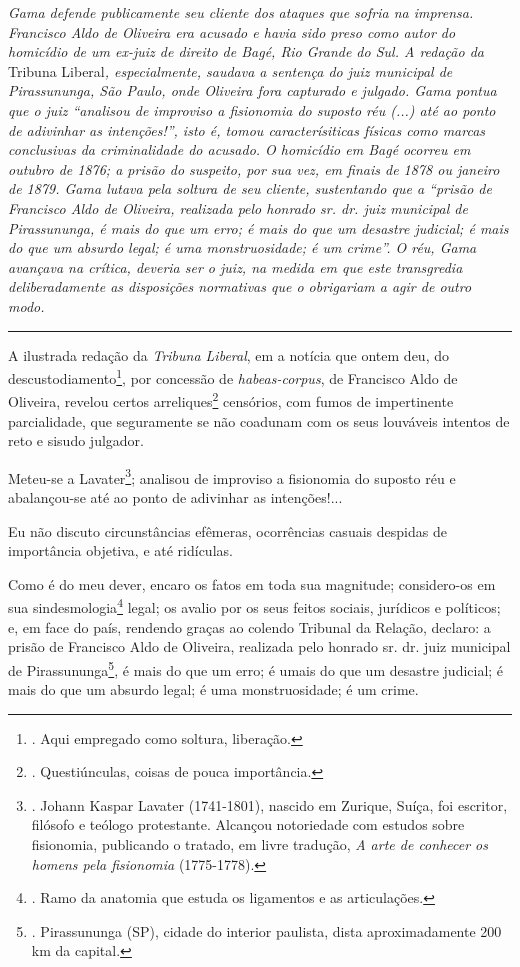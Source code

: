 \emph{Gama defende publicamente seu cliente dos ataques que sofria na
imprensa. Francisco Aldo de Oliveira era acusado e havia sido preso como
autor do homicídio de um ex-juiz de direito de Bagé, Rio Grande do Sul.
A redação da} Tribuna Liberal\emph{, especialmente, saudava a sentença
do juiz municipal de Pirassununga, São Paulo, onde Oliveira fora
capturado e julgado. Gama pontua que o juiz ``analisou de improviso a
fisionomia do suposto réu (...) até ao ponto de adivinhar as
intenções!'', isto é, tomou caracterísiticas físicas como marcas
conclusivas da criminalidade do acusado. O homicídio em Bagé ocorreu em
outubro de 1876; a prisão do suspeito, por sua vez, em finais de 1878 ou
janeiro de 1879. Gama lutava pela soltura de seu cliente, sustentando
que a ``prisão de Francisco Aldo de Oliveira, realizada pelo honrado sr.
dr. juiz municipal de Pirassununga, é mais do que um erro; é mais do que
um desastre judicial; é mais do que um absurdo legal; é uma
monstruosidade; é um crime''. O réu, Gama avançava na crítica, deveria
ser o juiz, na medida em que este transgredia deliberadamente as
disposições normativas que o obrigariam a agir de outro modo.}

\begin{center}\rule{0.5\linewidth}{\linethickness}\end{center}

A ilustrada redação da \emph{Tribuna Liberal}, em a notícia que ontem
deu, do descustodiamento\footnote{. Aqui empregado como soltura,
  liberação.}, por concessão de \emph{habeas-corpus}, de Francisco Aldo
de Oliveira, revelou certos arreliques\footnote{. Questiúnculas, coisas
  de pouca importância.} censórios, com fumos de impertinente
parcialidade, que seguramente se não coadunam com os seus louváveis
intentos de reto e sisudo julgador.

Meteu-se a Lavater\footnote{. Johann Kaspar Lavater (1741-1801), nascido
  em Zurique, Suíça, foi escritor, filósofo e teólogo protestante.
  Alcançou notoriedade com estudos sobre fisionomia, publicando o
  tratado, em livre tradução, \emph{A arte de conhecer os homens pela
  fisionomia} (1775-1778).}; analisou de improviso a fisionomia do
suposto réu e abalançou-se até ao ponto de adivinhar as intenções!...

Eu não discuto circunstâncias efêmeras, ocorrências casuais despidas de
importância objetiva, e até ridículas.

Como é do meu dever, encaro os fatos em toda sua magnitude; considero-os
em sua sindesmologia\footnote{. Ramo da anatomia que estuda os
  ligamentos e as articulações.} legal; os avalio por os seus feitos
sociais, jurídicos e políticos; e, em face do país, rendendo graças ao
colendo Tribunal da Relação, declaro: a prisão de Francisco Aldo de
Oliveira, realizada pelo honrado sr. dr. juiz municipal de
Pirassununga\footnote{. Pirassununga (SP), cidade do interior paulista,
  dista aproximadamente 200 km da capital.}, é mais do que um erro; é
umais do que um desastre judicial; é mais do que um absurdo legal; é uma
monstruosidade; é um crime.

